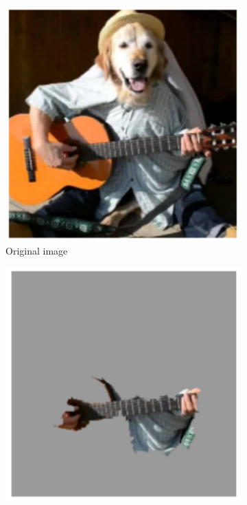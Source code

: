 \begin{figure}[H]
    \centering
    \begin{subfigure}[t]{.23\textwidth}
        \centering
        \includegraphics[width=\linewidth]{chapters/02_methods/images/lime_dog_1.png}
        \caption{Original image}
    \end{subfigure}\hfill%
    \begin{subfigure}[t]{.23\textwidth}
        \centering
        \includegraphics[width=\linewidth]{chapters/02_methods/images/lime_dog_2.png}

\end{subfigure}
\end{figure}
